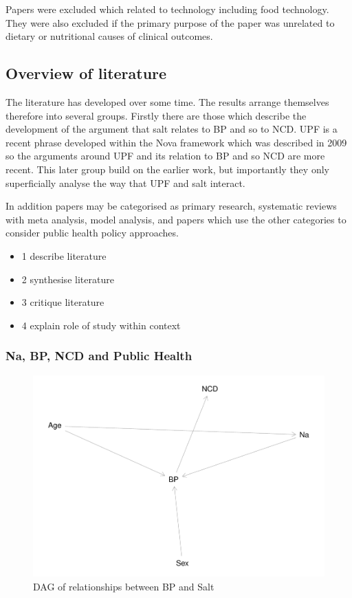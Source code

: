 \documentclass[
]{article}
\providecommand{\tightlist}{%
  \setlength{\itemsep}{0pt}\setlength{\parskip}{0pt}}
\begin{document}
Papers were excluded which related to technology including food
technology. They were also excluded if the primary purpose of the paper
was unrelated to dietary or nutritional causes of clinical outcomes.

\hypertarget{overview-of-literature}{%
\subsection{Overview of literature}\label{overview-of-literature}}

The literature has developed over some time. The results arrange
themselves therefore into several groups. Firstly there are those which
describe the development of the argument that salt relates to BP and so
to NCD. UPF is a recent phrase developed within the Nova framework which
was described in 2009 so the arguments around UPF and its relation to BP
and so NCD are more recent. This later group build on the earlier work,
but importantly they only superficially analyse the way that UPF and
salt interact.

In addition papers may be categorised as primary research, systematic
reviews with meta analysis, model analysis, and papers which use the
other categories to consider public health policy approaches.

\begin{itemize}
\tightlist
\item
  1 describe literature
\item
  2 synthesise literature
\item
  3 critique literature
\item
  4 explain role of study within context
\end{itemize}

\hypertarget{na-bp-ncd-and-public-health}{%
\subsubsection{Na, BP, NCD and Public
Health}\label{na-bp-ncd-and-public-health}}

\begin{figure}
\centering
\includegraphics{methodandresults_files/figure-latex/fig-dagNa-1.pdf}
\caption{DAG of relationships between BP and Salt}
\end{figure}
\end{document}
